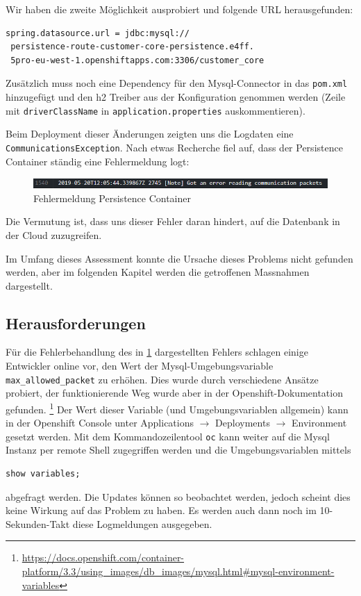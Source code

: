 \documentclass[12pt,a4paper]{article}
\begin{document}
Wir haben die zweite Möglichkeit ausprobiert und folgende URL herausgefunden:
\begin{lstlisting}
spring.datasource.url = jdbc:mysql://
 persistence-route-customer-core-persistence.e4ff.
 5pro-eu-west-1.openshiftapps.com:3306/customer_core
\end{lstlisting}
Zusätzlich muss noch eine Dependency für den Mysql-Connector in das \texttt{pom.xml} hinzugefügt und den h2 Treiber aus der Konfiguration genommen werden (Zeile mit \texttt{driver\-ClassName} in \texttt{application.properties} auskommentieren). 

Beim Deployment dieser Änderungen zeigten uns die Logdaten eine \texttt{Com\-munications\-Exception}. Nach etwas Recherche fiel auf, dass der Persistence Container ständig eine Fehlermeldung logt:

\begin{figure}[h]
	\centering
	\includegraphics[width=1\linewidth]{img/os-persistence-error}
	\caption{Fehlermeldung Persistence Container}
	\label{fig:os-persistence-error}
\end{figure}

Die Vermutung ist, dass uns dieser Fehler daran hindert, auf die Datenbank in der Cloud zuzugreifen. 
 
Im Umfang dieses Assessment konnte die Ursache dieses Problems nicht gefunden werden, aber im folgenden Kapitel werden die getroffenen Massnahmen dargestellt.

\subsection{Herausforderungen}
Für die Fehlerbehandlung des in \ref{fig:os-persistence-error} dargestellten Fehlers schlagen einige Entwickler online vor, den Wert der Mysql-Umgebungsvariable \texttt{max\_allowed\_packet} zu erhöhen. Dies wurde durch verschiedene Ansätze probiert, der funktionierende Weg wurde aber in der Openshift-Dokumentation gefunden.  \footnote{\url{https://docs.openshift.com/container-platform/3.3/using\_images/db\_images/mysql.html\#mysql-environment-variables}}
Der Wert dieser Variable (und Umgebungsvariablen allgemein) kann in der Openshift Console unter Applications $\rightarrow$ Deployments $\rightarrow$ Environment gesetzt werden. Mit dem Kommandozeilentool \texttt{oc} kann weiter auf die Mysql Instanz per remote Shell zugegriffen werden und die Umgebungsvariablen mittels 
\begin{lstlisting}
show variables;
\end{lstlisting}
abgefragt werden. Die Updates können so beobachtet werden, jedoch scheint dies keine Wirkung auf das Problem zu haben. Es werden auch dann noch im 10-Sekunden-Takt diese Logmeldungen ausgegeben. 
\end{document}
